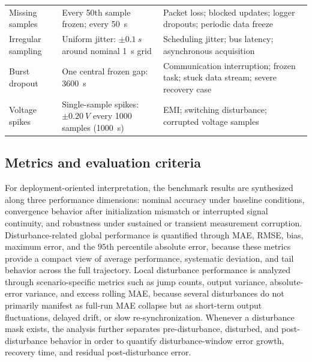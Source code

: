 \documentclass[review]{elsarticle}
\begin{document}
\begin{longtable}{@{}p{1.55cm}p{3.65cm}p{5.75cm}@{}}
    \addlinespace[2pt]
    Missing samples & Every 50th sample frozen; every \SI{50}{s} & Packet loss; blocked updates; logger dropouts; periodic data freeze \cite{naseriReliableWirelessBMS2025,liuAssessingImpactSampling2025} \\
    \addlinespace[2pt]
    Irregular sampling & Uniform jitter: $\pm\SI{0.1}{s}$ around nominal \SI{1}{s} grid & Scheduling jitter; bus latency; asynchronous acquisition \cite{bergerBenchmarkingBatteryManagement2024,naseriReliableWirelessBMS2025,liuAssessingImpactSampling2025} \\
    \addlinespace[2pt]
    Burst dropout & One central frozen gap: \SI{3600}{s} & Communication interruption; frozen task; stuck data stream; severe recovery case \cite{bergerBenchmarkingBatteryManagement2024,naseriReliableWirelessBMS2025} \\
    \addlinespace[2pt]
    Voltage spikes & Single-sample spikes: $\pm\SI{0.20}{V}$ every 1000 samples (\SI{1000}{s}) & EMI; switching disturbance; corrupted voltage samples \cite{aielloElectromagneticSusceptibilityBattery2020} \\
\end{longtable}
\endgroup

\subsection{Metrics and evaluation criteria}
For deployment-oriented interpretation, the benchmark results are synthesized along three performance dimensions: nominal accuracy under baseline conditions, convergence behavior after initialization mismatch or interrupted signal continuity, and robustness under sustained or transient measurement corruption. Disturbance-related global performance is quantified through MAE, RMSE, bias, maximum error, and the $95$th percentile absolute error, because these metrics provide a compact view of average performance, systematic deviation, and tail behavior across the full trajectory. Local disturbance performance is analyzed through scenario-specific metrics such as jump counts, output variance, absolute-error variance, and excess rolling MAE, because several disturbances do not primarily manifest as full-run MAE collapse but as short-term output fluctuations, delayed drift, or slow re-synchronization. Whenever a disturbance mask exists, the analysis further separates pre-disturbance, disturbed, and post-disturbance behavior in order to quantify disturbance-window error growth, recovery time, and residual post-disturbance error.
\end{document}

